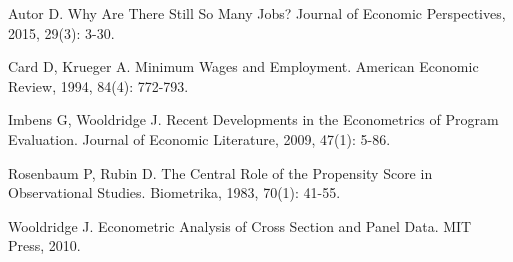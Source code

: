 \documentclass[12pt,a4paper]{article}
\begin{document}
\begin{enumerate}[label={[\arabic*]},leftmargin=2.2em,itemsep=0.2em]
\item Autor D. Why Are There Still So Many Jobs? Journal of Economic Perspectives, 2015, 29(3): 3-30.
\item Card D, Krueger A. Minimum Wages and Employment. American Economic Review, 1994, 84(4): 772-793.
\item Imbens G, Wooldridge J. Recent Developments in the Econometrics of Program Evaluation. Journal of Economic Literature, 2009, 47(1): 5-86.
\item Rosenbaum P, Rubin D. The Central Role of the Propensity Score in Observational Studies. Biometrika, 1983, 70(1): 41-55.
\item Wooldridge J. Econometric Analysis of Cross Section and Panel Data. MIT Press, 2010.
\end{enumerate}
\end{document}
